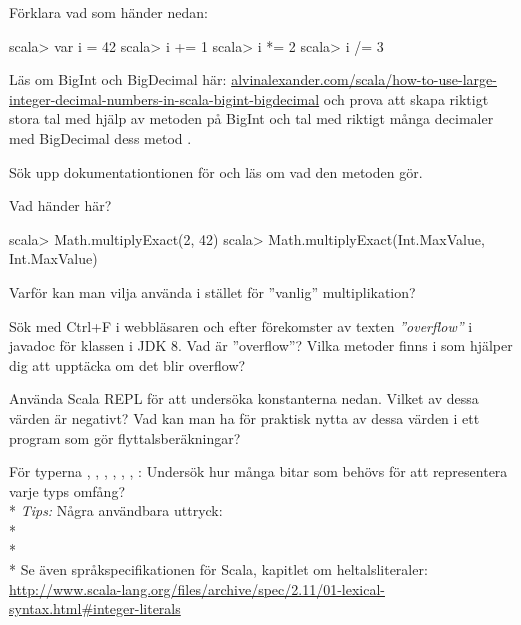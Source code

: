 {{{{{{{\Task Förklara vad som händer nedan:
\begin{REPL}
scala> var i = 42
scala> i += 1
scala> i *= 2
scala> i /= 3
\end{REPL}


\Task Läs om BigInt och BigDecimal här: \href{http://alvinalexander.com/scala/how-to-use-large-integer-decimal-numbers-in-scala-bigint-bigdecimal}{alvinalexander.com/scala/how-to-use-large-integer-decimal-numbers-in-scala-bigint-bigdecimal} och prova att skapa riktigt stora tal med hjälp av metoden  på BigInt och tal med riktigt många decimaler med BigDecimal dess metod .

\Task Sök upp dokumentationtionen för  och läs om vad den metoden gör.

\Subtask Vad händer här?
\begin{REPLnonum}
scala> Math.multiplyExact(2, 42)
scala> Math.multiplyExact(Int.MaxValue, Int.MaxValue)
\end{REPLnonum}

\Subtask\Pen Varför kan man vilja använda  i stället för ''vanlig'' multiplikation?



\Subtask\Pen Sök med Ctrl+F i webbläsaren och efter förekomster av texten \textit{''overflow''} i javadoc för klassen  i JDK 8. Vad är ''overflow''? Vilka metoder finns i  som hjälper dig att upptäcka om det blir overflow?

\Task Använda Scala REPL för att undersöka konstanterna nedan. Vilket av dessa värden är negativt? Vad kan man ha för praktisk nytta av dessa värden i ett program som gör flyttalsberäkningar?

\Subtask {}

\Subtask {}

\Subtask {}

\Task För typerna , , , , , , : Undersök hur många bitar som behövs för att representera varje typs omfång? \\*
\textit{Tips:} Några användbara uttryck: \\*
  \\*
  \\*
Se även språkspecifikationen för Scala, kapitlet om heltalsliteraler: \\
\url{http://www.scala-lang.org/files/archive/spec/2.11/01-lexical-syntax.html#integer-literals}

}}}}}}}
